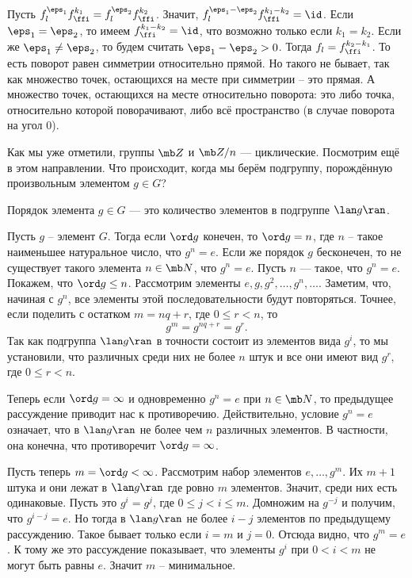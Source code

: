 Пусть $f_l^{\eps_1}f_{\ffi}^{k_1}=f_l^{\eps_2}f_{\ffi}^{k_2}$. Значит, $f_l^{\eps_1-\eps_2}f_{\ffi}^{k_1-k_2}=\id$.
Если $\eps_1=\eps_2$, то имеем $f_{\ffi}^{k_1-k_2}=\id$, что возможно только если $k_1=k_2$. Если же $\eps_1\neq \eps_2$, то будем считать $\eps_1-\eps_2>0$. Тогда $f_{l}=f_{\ffi}^{k_2-k_1}$. То есть поворот равен симметрии относительно прямой. Но такого не бывает, так как множество точек, остающихся на месте при симметрии -- это прямая. А множество точек, остающихся на месте относительно поворота: это либо точка, относительно которой поворачивают, либо всё пространство (в случае поворота на угол $0$).
\endproof
\eenm

Как мы уже отметили, группы $\mb Z$ и $\mb Z/n$ --- циклические. Посмотрим ещё в этом направлении. Что происходит, когда мы берём подгруппу, порождённую произвольным элементом $g \in G$? 


\dfn Порядок элемента $g\in G$ --- это количество элементов в подгруппе $\lan g \ran$.
\edfn

\lm Пусть $g$ -- элемент $G$. Тогда если $\ord g$ конечен, то $\ord g=n$, где $n$ -- такое наименьшее натуральное число, что $g^n=e$. Если же порядок $g$ бесконечен, то не существует такого элемента $n\in \mb N$, что $g^n=e$. 
\elm
\proof Пусть $n$ --- такое, что $g^n=e$. Покажем, что $\ord g \leq n$. Рассмотрим элементы $e,g,g^2,\dots,g^n, \dots$. Заметим, что, начиная с $g^n$, все элементы этой последовательности будут повторяться. Точнее, если поделить с остатком $m=nq+r$, где $0\leq r<n$, то
$$g^m=g^{nq+r}=g^r.$$
Так как подгруппа $\lan g \ran$ в точности состоит из элементов вида $g^i$, то мы установили, что различных среди них не более $n$ штук и все они имеют вид $g^r$, где $0\leq r < n$. 

Теперь если  $\ord g= \infty$ и одновременно $g^n=e$ при $n \in \mb N$, то предыдущее рассуждение приводит нас к противоречию. Действительно, условие $g^n=e$ означает, что в $\lan g\ran$ не более чем $n$ различных элементов. В частности, она конечна, что противоречит  $\ord g= \infty$.

Пусть теперь  $m=\ord g < \infty$. Рассмотрим набор элементов $e,\dots,g^m$. Их $m+1$ штука и они лежат в $\lan g \ran$ где ровно $m$ элементов. Значит, среди них есть одинаковые. Пусть это $g^i=g^j$, где $0\leq j <i\leq m$. Домножим на $g^{-j}$ и получим, что $g^{i-j}=e$. Но тогда в $\lan g \ran $ не более $i-j$ элементов по предыдущему рассуждению. Такое бывает только если $i=m$ и $j=0$.  Отсюда видно, что $g^m=e$. К тому же это рассуждение показывает, что элементы $g^i$ при $0<i<m$ не могут быть равны $e$. Значит $m$ -- минимальное. 
\endproof

